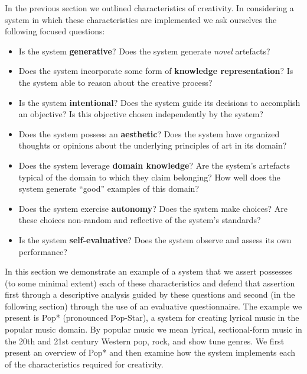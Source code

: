 \documentclass[phd,electronic,oneside,twosidetoc,letterpaper,chaptercenter,parttop,lof,lot]{byumsphd}
\begin{document}
In the previous section we outlined characteristics of creativity. In considering a system in which these characteristics are implemented we ask ourselves the following focused questions:

\begin{itemize}
\item Is the system \textbf{generative}? Does the system generate \textit{novel} artefacts?
\item Does the system incorporate some form of \textbf{knowledge representation}? Is the system able to reason about the creative process?
\item Is the system \textbf{intentional}? Does the system guide its decisions to accomplish an objective? Is this objective chosen independently by the system?
\item Does the system possess an \textbf{aesthetic}? Does the system have organized thoughts or opinions about the underlying principles of art in its domain?
\item Does the system leverage \textbf{domain knowledge}? Are the system's artefacts typical of the domain to which they claim belonging? How well does the system generate ``good'' examples of this domain?
\item Does the system exercise \textbf{autonomy}? Does the system make choices? Are these choices non-random and reflective of the system's standards?
\item Is the system \textbf{self-evaluative}? Does the system observe and assess its own performance?
\end{itemize}

In this section we demonstrate an example of a system that we assert possesses (to some minimal extent) each of these characteristics and defend that assertion first through a descriptive analysis guided by these questions and second (in the following section) through the use of an evaluative questionnaire. The example we present is Pop* (pronounced Pop-Star), a system for creating lyrical music in the popular music domain. By popular music we mean lyrical, sectional-form music in the 20th and 21st century Western pop, rock, and show tune genres. We first present an overview of Pop* and then examine how the system implements each of the characteristics required for creativity.
\end{document}
